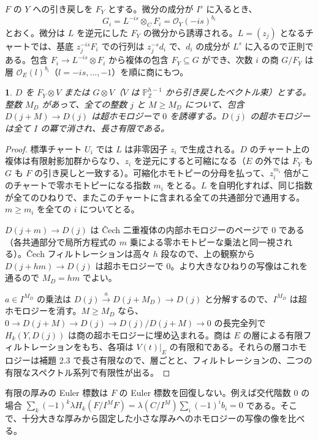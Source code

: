 \documentclass[11pt,a4paper]{ltjsarticle}
\newcommand{\stmtname}{}
\theoremstyle{plain}
\newtheorem*{stmtgen}{\stmtname}
\newenvironment{stmt}[1]{\renewcommand{\stmtname}{#1}\begin{stmtgen}}{\end{stmtgen}}
\theoremstyle{definition}
\newcommand{\Z}{\mathbb{Z}}
\newcommand{\PP}{\mathbb{P}}
\newcommand{\cO}{\mathcal{O}}
\begin{document}
$F$ の $Y$ への引き戻しを $F_Y$ とする。微分の成分が $I^s$ に入るとき、
\begin{equation}\tag{2.6}
  G_i = L^{-is}\otimes_CF_i = \cO_Y(-is)^{b_i}
\end{equation}
とおく。微分は $L$ を逆元にした $F_Y$ の微分から誘導される。$L = (z_j)$ となるチャートでは、基底 $z_j^{-is}F_i$ での行列は $z_j^{-s}d_i$ で、$d_i$ の成分が $L^s$ に入るので正則である。包含 $F_i\to L^{-is}\otimes F_i$ から複体の包含 $F_Y\subseteq G$ ができ、次数 $i$ の商 $G/F_Y$ は層 $\cO_E(l)^{b_i}$（$l = -is,\dots,-1$）を順に商にもつ。

\begin{stmt}{補題 2.4}
$D$ を $F_Y\otimes V$ または $G\otimes V$（$V$ は $\PP^{h-1}_\Z$ から引き戻したベクトル束）とする。整数 $M_D$ があって、全ての整数 $j$ と $M\ge M_D$ について、包含 $D(j+M)\to D(j)$ は超ホモロジーで $0$ を誘導する。$D(j)$ の超ホモロジーは全て $I$ の冪で消され、長さ有限である。
\end{stmt}
\begin{proof}
標準チャート $U_i$ では $L$ は非零因子 $z_i$ で生成される。$D$ のチャート上の複体は有限射影加群からなり、$z_i$ を逆元にすると可縮になる（$E$ の外では $F_Y$ も $G$ も $F$ の引き戻しと一致する）。可縮化ホモトピーの分母を払って、$z_i^{m_i}$ 倍がこのチャートで零ホモトピーになる指数 $m_i$ をとる。$L$ を自明化すれば、同じ指数が全てのひねりで、またこのチャートに含まれる全ての共通部分で通用する。$m\ge m_i$ を全ての $i$ についてとる。

$D(j+m)\to D(j)$ は Čech 二重複体の内部ホモロジーのページで $0$ である（各共通部分で局所方程式の $m$ 乗による零ホモトピーな乗法と同一視される）。Čech フィルトレーションは高々 $h$ 段なので、上の観察から $D(j+hm)\to D(j)$ は超ホモロジーで $0$。より大きなひねりの写像はこれを通るので $M_D = hm$ でよい。

$a\in I^{M_D}$ の乗法は $D(j)\xrightarrow{a}D(j+M_D)\to D(j)$ と分解するので、$I^{M_D}$ は超ホモロジーを消す。$M\ge M_D$ なら、$0\to D(j+M)\to D(j)\to D(j)/D(j+M)\to0$ の長完全列で $H_k(Y,D(j))$ は商の超ホモロジーに埋め込まれる。商は $E$ の層による有限フィルトレーションをもち、各項は $V(t)|_E$ の有限和である。それらの層コホモロジーは補題 2.3 で長さ有限なので、層ごとと、フィルトレーションの、二つの有限なスペクトル系列で有限性が出る。
\end{proof}

有限の厚みの Euler 標数は $F$ の Euler 標数を回復しない。例えば交代階数 $0$ の場合
$\sum_k(-1)^k\lambda H_k(F/I^MF) = \lambda(C/I^M)\sum_i(-1)^ib_i = 0$
である。そこで、十分大きな厚みから固定した小さな厚みへのホモロジーの写像の像を比べる。
\end{document}
